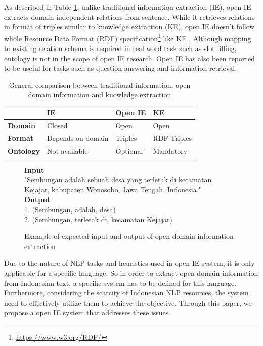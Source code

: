 \documentclass[conference,compsoc]{IEEEtran}
\begin{document}
As described in Table \ref{table_paradigm_comparison}, unlike traditional information extraction (IE), open IE extracts domain-independent relations from sentence. While it retrieves relations in format of triples similar to knowledge extraction (KE), open IE doesn't follow whole Resource Data Format (RDF) specification\footnote{\url{https://www.w3.org/RDF/}} like KE\cite{auer2007dbpedia} \cite{exner2014refractive}. Although mapping to existing relation schema is required in real word task such as slot filling\cite{angeli2015leveraging}, ontology is not in the scope of open IE research. Open IE has also been reported to be useful for tasks such as question answering\cite{fader2011identifying} and information retrieval\cite{etzioni2011search}. 

\begin{table}[!t]
\renewcommand{\arraystretch}{1.5}
\caption{General comparison between traditional information, open domain information and knowledge extraction}
\label{table_paradigm_comparison}
\centering
\begin{tabular}{|l|>{\centering\arraybackslash}p{1.5cm}|>{\centering\arraybackslash}p{1.5cm}|>{\centering\arraybackslash}p{1.5cm}|}
\hline 
 & \textbf{IE} & \textbf{Open IE} & \textbf{KE} \\ 
\hline 
\textbf{Domain} & Closed & Open & Open \\ 
\hline 
\textbf{Format} & Depends on domain & Triples & RDF Triples \\ 
\hline 
\textbf{Ontology} & Not available & Optional & Mandatory \\ 
\hline 
\end{tabular} 
\end{table}

\begin{figure}
\textbf{Input} \\[0.1cm]
"Sembungan adalah sebuah desa yang terletak di kecamatan Kejajar, kabupaten Wonosobo, Jawa Tengah, Indonesia." \\[0.5cm]
\textbf{Output} \\[0.1cm]
1. (Sembungan, adalah, desa) \\
2. (Sembungan, terletak di, kecamatan Kejajar) \\
\caption{Example of expected input and output of open domain information extraction}
\label{fig_example_io_openie}
\end{figure}

Due to the nature of NLP tasks and heuristics used in open IE system, it is only applicable for a specific language\cite{banko2007open}. So in order to extract open domain information from Indonesian text, a specific system has to be defined for this language. Furthermore, considering the scarcity of Indonesian NLP resources, the system need to effectively utilize them to achieve the objective. Through this paper, we propose a open IE system that addresses these issues.
\end{document}

